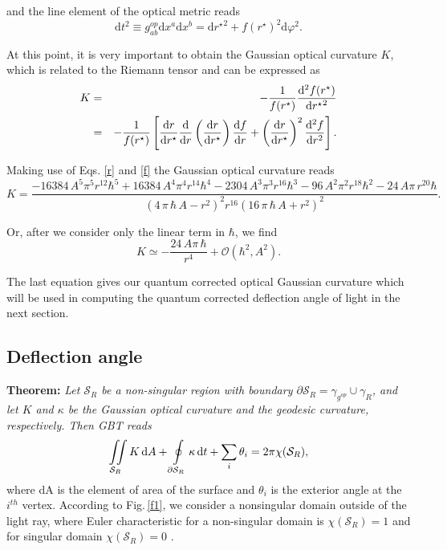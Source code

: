 \documentclass[preprint,superscriptaddress,amsfonts,amssymb,amsmath,showpacs]{revtex4}
\begin{document}
and the line element of the optical metric reads 
\begin{equation}
\mathrm{d}t^2 \equiv g_{ab}^{op} \mathrm{d}x^a \mathrm{d}x^b={\mathrm{d}r^{\star}}^{2}+{f(r^{\star})}^2 \mathrm{d}\varphi^2.
\end{equation}

At this point, it is very important to obtain the Gaussian optical curvature $K$, which is related to the Riemann tensor and can be expressed as \cite{gibbons1}
\begin{eqnarray}
K&=&-\frac{1}{f(r^{\star })}\frac{\mathrm{d}^{2}f(r^{\star })}{\mathrm{d}{%
r^{\star }}^{2}}\\
&=& -\frac{1}{f(r^{\star })}\left[ \frac{\mathrm{d}r}{\mathrm{d}r^{\star }}%
\frac{\mathrm{d}}{\mathrm{d}r}\left( \frac{\mathrm{d}r}{\mathrm{d}r^{\star }}%
\right) \frac{\mathrm{d}f}{\mathrm{d}r}+\left( \frac{\mathrm{d}r}{\mathrm{d}%
r^{\star }}\right) ^{2}\frac{\mathrm{d}^{2}f}{\mathrm{d}r^{2}}\right].\notag
\end{eqnarray}

Making use of Eqs. \eqref{r} and \eqref{f} the Gaussian optical curvature reads
\begin{equation}
K={\frac {-16384\,{A}^{5}{\pi}^{5}{r}^{12}{\hbar }^{5}+16384\,{A}^{4}{
\pi}^{4}{r}^{14}{\hbar }^{4}-2304\,{A}^{3}{\pi}^{3}{r}^{16}{\hbar }^{3
}-96\,{A}^{2}{\pi}^{2}{r}^{18}{\hbar }^{2}-24\,A\pi\,{r}^{20}\hbar }{
 \left( 4\,\pi\,\hbar \,A-{r}^{2} \right) ^{2}{r}^{16} \left( 16\,\pi
\,\hbar \,A+{r}^{2} \right) ^{2}}}.
\end{equation}

Or, after we consider only the linear term in $\hbar$, we find
\begin{equation}  \label{GC1}    
K \simeq  -{\frac {24\,A\pi\,\hbar }{{r}^{4}}}+\mathcal{O}(\hbar^2,A^2).
\end{equation}

The last equation gives our quantum corrected optical Gaussian curvature which will be used in computing the quantum corrected deflection angle of light in the next section.
\newpage

\subsection{Deflection angle}
\textbf{Theorem:} \textit{Let  $\mathcal{S}_{R}$ be a non-singular region with boundary $\partial
\mathcal{S}_{R}=\gamma _{g^{op}}\cup \gamma_{R}$, and let $K$ and $\kappa$ be the Gaussian optical curvature and the geodesic curvature, respectively. Then GBT reads}  \cite{gibbons1}
\begin{equation}\label{GBT}
\iint\limits_{\mathcal{S}_{R}}K\,\mathrm{d}A+\oint\limits_{\partial \mathcal{%
S}_{R}}\kappa \,\mathrm{d}t+\sum_{i}\theta _{i}=2\pi \chi (\mathcal{S}_{R}),
\end{equation}
where dA is the element of area of the surface and
 $\theta_{i}$ is the exterior angle at the $i^{th}$ vertex. According to Fig.\,\ref{f1}, we consider a nonsingular domain outside of the light ray, where Euler characteristic for a non-singular domain is  $\chi (\mathcal{S}_{R}) = 1$ and for singular domain $\chi (\mathcal{S}_{R}) = 0$ \cite{gibbons1}. 
\end{document}
